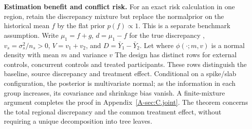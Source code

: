 \documentclass[11pt]{article}
\theoremstyle{remark}\newtheorem{remark}{Remark}[section]
\providecommand{\DIFaddtex}[1]{{\protect\color{blue} \sf #1}} %
\providecommand{\DIFdeltex}[1]{{\protect\color{red} \scriptsize #1}} %
\providecommand{\DIFaddbegin}{} %
\providecommand{\DIFaddend}{} %
\providecommand{\DIFdelbegin}{} %
\providecommand{\DIFdelend}{} %
\providecommand{\DIFadd}[1]{\texorpdfstring{\DIFaddtex{#1}}{#1}} %
\providecommand{\DIFdel}[1]{\texorpdfstring{\DIFdeltex{#1}}{}} %
\begin{document}
\DIFdelbegin %
\DIFdel{\textbf{Estimation benefit and conflict risk.}
For an exact risk calculation in one region, retain the discrepancy mixture but replace the normalprior on the historical mean $f$ by the flat prior $p(f)\propto1$. This is a separate benchmark assumption. Write $\mu_1=f+g$, $d=\mu_1-f$ for the true discrepancy , $v_s=\sigma_s^2/n_s>0$, $V=v_1+v_2$, and $D=\bar Y_1-\bar Y_2$. Let
}%
\DIFdel{where $\phi(\cdot;m,v)$ is a normal density with mean $m$ and variance $v$}\DIFdelend \DIFaddbegin \DIFadd{The design has distinct rows for external controls, concurrent controls and treated participants. These rows distinguish the baseline, source discrepancy and treatment effect. Conditional on a spike/slab configuration, the posterior is multivariate normal; as the information in each group increases, its covariance and shrinkage bias vanish. A finite-mixture argument completes the proof in Appendix~\ref{A-sec:C.joint}. The theorem concerns the total regional discrepancy and the common treatment effect, without requiring a unique decomposition into tree leaves}\DIFaddend .
\end{document}
